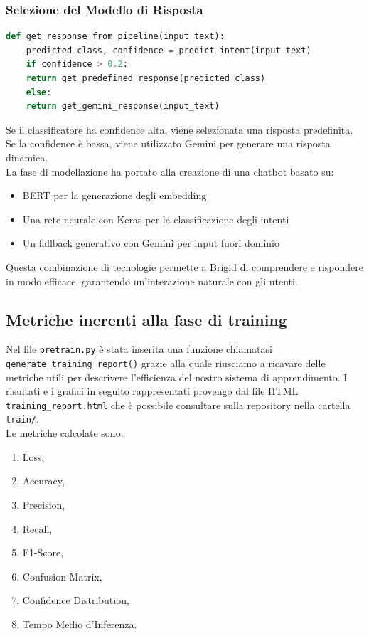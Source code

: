 \documentclass[12pt, letterpaper]{article}
\begin{document}
\subsubsection{Selezione del Modello di Risposta}
\begin{lstlisting}[language=Python]
	def get_response_from_pipeline(input_text):
	predicted_class, confidence = predict_intent(input_text)
	if confidence > 0.2:
	return get_predefined_response(predicted_class)
	else:
	return get_gemini_response(input_text)
\end{lstlisting}
Se il classificatore ha confidence alta, viene selezionata una risposta predefinita. Se la confidence è bassa, viene utilizzato Gemini per generare una risposta dinamica.\\
\newline
La fase di modellazione ha portato alla creazione di una chatbot basato su:
\begin{itemize}
	\item BERT per la generazione degli embedding
	\item Una rete neurale con Keras per la classificazione degli intenti
	\item Un fallback generativo con Gemini per input fuori dominio
\end{itemize}
Questa combinazione di tecnologie permette a Brigid di comprendere e rispondere in modo efficace, garantendo un'interazione naturale con gli utenti.

\subsection{Metriche inerenti alla fase di training}
Nel file \texttt{pretrain.py} è stata inserita una funzione chiamatasi \texttt{generate\_training\_report()} grazie alla quale riusciamo a ricavare delle metriche utili per descrivere l'efficienza del nostro sistema di apprendimento. I risultati e i grafici in seguito rappresentati provengo dal file HTML \texttt{training\_report.html} che è possibile consultare sulla repository nella cartella \texttt{train/}.\\
\newline
Le metriche calcolate sono:
\begin{enumerate}
	\item Loss,
	\item Accuracy,
	\item Precision,
	\item Recall,
	\item F1-Score,
	\item Confusion Matrix,
	\item Confidence Distribution,
	\item Tempo Medio d'Inferenza.
	\end{enumerate}
	
\end{document}
